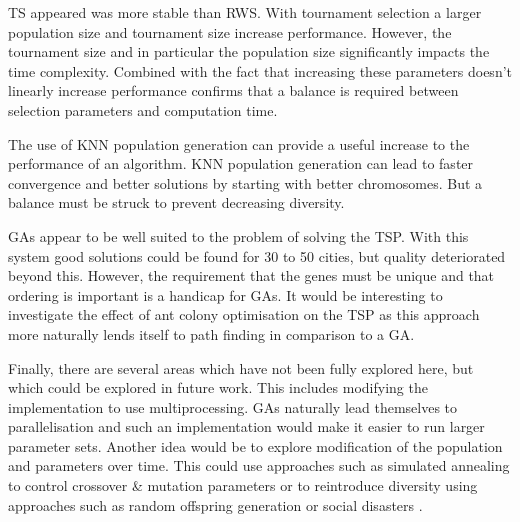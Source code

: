 \documentclass[journal]{IEEEtran}
\begin{document}
TS appeared was more stable than RWS. With tournament selection a larger population size and tournament size increase performance. However, the tournament size and in particular the population size significantly impacts the time complexity. Combined with the fact that increasing these parameters doesn't linearly increase performance  confirms that a balance is required between selection parameters and computation time.

The use of KNN population generation can provide a useful increase to the performance of an algorithm. KNN population generation can lead to faster convergence and better solutions by starting with better chromosomes. But a balance must be struck to prevent decreasing diversity.

GAs appear to be well suited to the problem of solving the TSP. With this system good solutions could be found for 30 to 50 cities, but quality deteriorated beyond this. However, the requirement that the genes must be unique and that ordering is important is a handicap for GAs. It would be interesting to investigate the effect of ant colony optimisation on the TSP as this approach more naturally lends itself to path finding in comparison to a GA.

Finally, there are several areas which have not been fully explored here, but which could be explored in future work. This includes modifying the implementation to use multiprocessing. GAs naturally lead themselves to parallelisation and such an implementation would make it easier to run larger parameter sets. Another idea would be to explore modification of the population and parameters over time. This could use approaches such as simulated annealing to control crossover \& mutation parameters or to reintroduce diversity using approaches such as random offspring generation \cite{rocha1999preventing} or social disasters \cite{kureichick1996some}.



%
%
\end{document}
